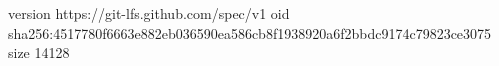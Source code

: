 version https://git-lfs.github.com/spec/v1
oid sha256:4517780f6663e882eb036590ea586cb8f1938920a6f2bbdc9174c79823ce3075
size 14128

